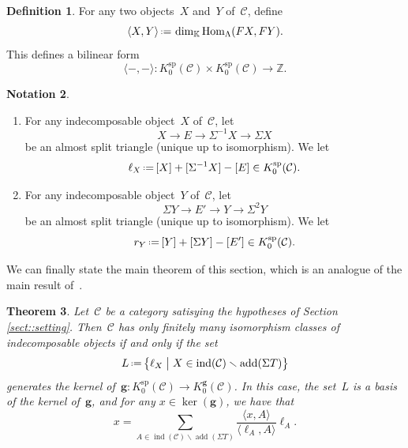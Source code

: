 \documentclass{amsart}
\newtheorem{theorem}{Theorem}[section]
\theoremstyle{definition}
\newtheorem{definition}[theorem]{Definition}
\newtheorem{notation}[theorem]{Notation}
\newcommand{\Z}{\mathbb{Z}} %
\renewcommand{\b}[1]{{\boldsymbol{#1}}} %
\newcommand{\bigset}[2]{\big\{ #1 \;\big|\; #2 \big\}} %
\newcommand{\ssm}{\smallsetminus} %
\newcommand{\eqdef}{\mbox{\,\raisebox{0.2ex}{\scriptsize\ensuremath{\mathrm:}}\ensuremath{=}\,}} %
\newcommand{\field}{\mathbb{K}}
\newcommand{\cat}{\mathcal{C}}
\newcommand{\Hom}[1]{\operatorname{Hom}_{#1}}
\newcommand{\susp}{\Sigma}
\newcommand{\add}{\operatorname{add}}
\newcommand{\spl}{\operatorname{sp}}
\newcommand{\Ksp}{K_0^{\spl}}
\newcommand{\Kg}{K_0^{\b{g}}}
\newcommand{\ind}{\operatorname{ind}}
\begin{document}
\begin{definition}\label{defi::bilinear form}
 For any two objects~$X$ and~$Y$ of~$\cat$, define
 \[
  \langle X, Y \rangle \eqdef \dim_{\field} \Hom{\Lambda}(FX,FY).
 \]
 This defines a bilinear form
 \[
  \langle -,-\rangle : \Ksp(\cat) \times \Ksp(\cat) \xrightarrow{} \Z.
 \]
\end{definition}

\begin{notation}\label{notation::ell_X}
\begin{enumerate}
 \item For any indecomposable object~$X$ of~$\cat$, let
 \[
  X \to E \to \susp^{-1} X \to \susp X
 \]
 be an almost split triangle (unique up to isomorphism).  We let
 \[
  \ell_X \eqdef [X] + [\susp^{-1} X]  - [E] \in \Ksp(\cat).
 \]
 
 \item For any indecomposable object~$Y$ of~$\cat$, let
 \[
  \susp Y \to E' \to  Y \to \susp^2 Y
 \]
 be an almost split triangle (unique up to isomorphism).  We let
 \[
  r_Y \eqdef [Y] + [\susp Y]  - [E'] \in \Ksp(\cat).
 \]
\end{enumerate}
\end{notation}


We can finally state the main theorem of this section, which is an analogue of the main result of~\cite{Auslander1984}.

\begin{theorem}\label{theo::relations-g-vecteurs}
 Let~$\cat$ be a category satisying the hypotheses of Section \ref{sect::setting}.  Then~$\cat$ has only finitely many isomorphism classes of indecomposable objects if and only if the set
 \[
 L \eqdef \bigset{\ell_X}{X\in \ind(\cat) \ssm \add(\susp T)}
 \]
 generates the kernel of~$\b g:\Ksp(\cat) \to \Kg(\cat)$. 
 In this case, the set~$L$ is a basis of the kernel of~$\b g$, and for any $x\in \ker(\b g)$, we have that
 \[
  x= \sum_{A\in \ind(\cat) \ssm \add(\susp T)} \frac{\langle x, A \rangle}{\langle \ell_A, A \rangle} \ell_A.
 \]
\end{theorem}
\end{document}
